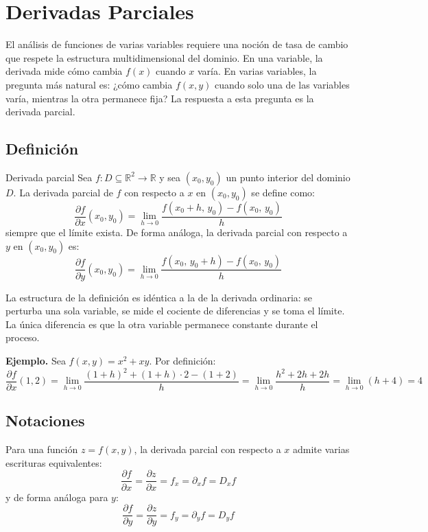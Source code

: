 \section{Derivadas Parciales}

El análisis de funciones de varias variables requiere una noción de tasa de cambio que respete la estructura multidimensional del dominio. En una variable, la derivada mide cómo cambia $f(x)$ cuando $x$ varía. En varias variables, la pregunta más natural es: ¿cómo cambia $f(x, y)$ cuando solo una de las variables varía, mientras la otra permanece fija? La respuesta a esta pregunta es la derivada parcial.

\subsection{Definición}

\begin{mydefinition}{Derivada parcial}
Sea $f: D \subseteq \mathbb{R}^2 \to \mathbb{R}$ y sea $(x_0, y_0)$ un punto interior del dominio $D$. La derivada parcial de $f$ con respecto a $x$ en $(x_0, y_0)$ se define como:
\[
\frac{\partial f}{\partial x}(x_0, y_0) = \lim_{h \to 0} \frac{f(x_0 + h,\, y_0) - f(x_0,\, y_0)}{h}
\]
siempre que el límite exista. De forma análoga, la derivada parcial con respecto a $y$ en $(x_0, y_0)$ es:
\[
\frac{\partial f}{\partial y}(x_0, y_0) = \lim_{h \to 0} \frac{f(x_0,\, y_0 + h) - f(x_0,\, y_0)}{h}
\]
\end{mydefinition}

La estructura de la definición es idéntica a la de la derivada ordinaria: se perturba una sola variable, se mide el cociente de diferencias y se toma el límite. La única diferencia es que la otra variable permanece constante durante el proceso.

\textbf{Ejemplo.} Sea $f(x, y) = x^2 + xy$. Por definición:
\[
\frac{\partial f}{\partial x}(1, 2) = \lim_{h \to 0} \frac{(1+h)^2 + (1+h) \cdot 2 - (1 + 2)}{h}
= \lim_{h \to 0} \frac{h^2 + 2h + 2h}{h} = \lim_{h \to 0} (h + 4) = 4
\]

\subsection{Notaciones}

Para una función $z = f(x, y)$, la derivada parcial con respecto a $x$ admite varias escrituras equivalentes:
\[
\frac{\partial f}{\partial x} = \frac{\partial z}{\partial x} = f_x = \partial_x f = D_x f
\]
y de forma análoga para $y$:
\[
\frac{\partial f}{\partial y} = \frac{\partial z}{\partial y} = f_y = \partial_y f = D_y f
\]

